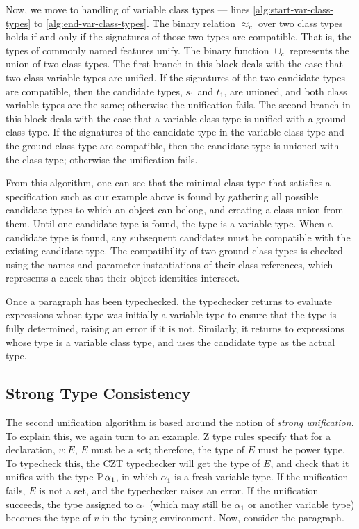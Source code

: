 Now, we move to handling of variable class types --- lines
\ref{alg:start-var-class-types} to \ref{alg:end-var-class-types}. The
binary relation $\approx_{c}$ over two class types holds if and
only if the signatures of those two types are compatible. That is, the
types of commonly named features unify. The binary function
$\cup_{c}$ represents the union of two class types. The first
branch in this block deals with the case that two class variable types
are unified.  If the signatures of the two candidate types are
compatible, then the candidate types, $s_1$ and $t_1$, are unioned, and
both class variable types are the same; otherwise the unification
fails. The second branch in this block deals with the case that a
variable class type is unified with a ground class type. If the
signatures of the candidate type in the variable class type and the
ground class type are compatible, then the candidate type is unioned
with the class type; otherwise the unification fails.

From this algorithm, one can see that the minimal class type that
satisfies a specification such as our example above is found by
gathering all possible candidate types to which an object can belong,
and creating a class union from them. Until one candidate type is
found, the type is a variable type. When a candidate type is found,
any subsequent candidates must be compatible with the existing
candidate type. The compatibility of two ground class types is checked
using the names and parameter instantiations of their class
references, which represents a check that their object identities
intersect.

Once a paragraph has been typechecked, the typechecker returns to
evaluate expressions whose type was initially a variable type to
ensure that the type is fully determined, raising an error if it is
not. Similarly, it returns to expressions whose type is a variable
class type, and uses the candidate type as the actual type.

\subsection{Strong Type Consistency}

The second unification algorithm is based around the notion of {\em
  strong unification}. To explain this, we again turn to an
  example. Z type rules specify that for a declaration, $v : E$, $E$
  must be a set; therefore, the type of $E$ must be power type. To
  typecheck this, the CZT typechecker will get the type of $E$, and
  check that it unifies with the type $\power \alpha_1$, in which
  $\alpha_1$ is a fresh variable type. If the unification fails, $E$
  is not a set, and the typechecker raises an error. If the
  unification succeeds, the type assigned to $\alpha_1$ (which may
  still be $\alpha_1$ or another variable type) becomes the type of
  $v$ in the typing environment. Now, consider the paragraph.

